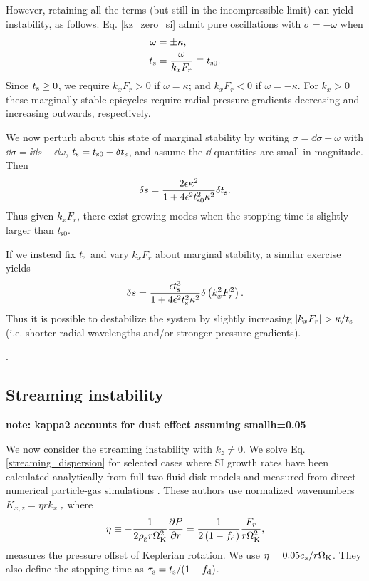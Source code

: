 However, retaining all the terms (but still in the incompressible
limit) can yield instability, as follows. Eq. \ref{kz_zero_si} admit
pure oscillations with $\sigma = -\omega$ when 
\begin{align*}
  \omega &= \pm \kappa, \\
  t_\mathrm{s} & = \frac{\omega}{ k _x F_r }
         \equiv t_{\mathrm{s}0}.
\end{align*} 
Since $t_\mathrm{s}\geq 0$, we require $k_xF_r > 0$ if $\omega = \kappa$;
and $k_xF_r < 0$ if $\omega = -\kappa$. For $k_x>0$ these marginally
stable epicycles require radial pressure gradients decreasing and increasing
outwards, respectively.  


We now perturb about this state of marginal stability by writing
$\sigma = \dd \sigma - \omega $ with $\dd\sigma = \ii\dd s -
\dd\omega$, $t_\mathrm{s} = t_{\mathrm{s}0} +
\delta t_\mathrm{s} $, and assume the $\dd$ quantities are small in
magnitude. Then 
\begin{align*} 
\delta s = \frac{2\epsilon \kappa^2 }{1 +
  4\epsilon^2 t_{\mathrm{s}0}^2\kappa^2}\delta t_\mathrm{s}. 
\end{align*}
Thus given $k_xF_r$, there exist growing modes 
when the stopping time is slightly larger than
$t_{\mathrm{s}0}$.  


If we instead fix $t_\mathrm{s}$ and vary $k_xF_r$ about marginal stability,
a similar exercise yields  
\begin{align*} 
  \delta s = \frac{\epsilon t_\mathrm{s}^3}{1 +
  4\epsilon^2 t_\mathrm{s}^2 \kappa^2}\delta \left(k_x^2F_r^2\right).  
\end{align*}
Thus it is possible to destabilize the system by slightly increasing
$|k_xF_r|>\kappa/ \tstop$ (i.e. shorter radial wavelengths and/or
stronger pressure gradients).   


 
\citep[cf. the `convective overstability', ][]{klahr14,lyra14,latter16}.  




\subsection{Streaming instability}

{\bf note: kappa2 accounts for dust effect assuming smallh=0.05}

We now consider the streaming instability with $k_z\neq 0$. 
We solve Eq. \ref{streaming_dispersion} for selected cases where SI  
growth rates have been 
calculated analytically from full two-fluid disk models and measured 
from direct numerical particle-gas simulations 
\citep[namely][]{youdin07b,bai10b}. These authors use normalized
wavenumbers $K_{x,z} = \eta r k_{x,z}$ where
\begin{align} 
  \eta \equiv -\frac{1}{2\rho_\mathrm{g} r\Omega_{\rm K}^2}\frac{\partial P}{\partial r} = 
  \frac{1}{2\left(1-f_\mathrm{d}\right)}\frac{F_r}{r\Omega_{\rm K}^2}, 
\end{align} 
measures the pressure offset of Keplerian rotation. We use
$\eta=0.05c_s/r\Omega_{\rm K}$. They also define the stopping time as
$\tau_\mathrm{s}=t_\mathrm{s}/(1-f_\mathrm{d})$.  

